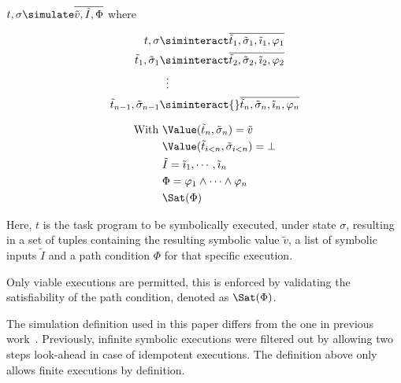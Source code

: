 \begin{definition}[Simulation]
  $t,\sigma\simulate \overline{\tilde{v},\tilde{I},\Phi}$ where

  \begin{minipage}[c]{0.4\textwidth}
    \begin{align*}
      t,\sigma             & \siminteract  \overline{\tilde{t}_1,\tilde{\sigma}_1,\tilde{\imath}_1,\phi_1}\\
      \tilde{t}_1,\tilde{\sigma}_1         & \siminteract  \overline{\tilde{t}_2,\tilde{\sigma}_2,\tilde{\imath}_2,\phi_2}\\
                           & \hspace{2mm}\vdots    \\
      \tilde{t}_{n-1},\tilde{\sigma}_{n-1} & \siminteract{}  \overline{\tilde{t}_n,\tilde{\sigma}_n,\tilde{\imath}_n,\phi_n}
    \end{align*}
\end{minipage}
\begin{minipage}[c]{0.1\textwidth}
  \Quad
\end{minipage}
\begin{minipage}[c]{0.3\textwidth}
  \begin{align*}
    \text{With }& \Value(\tilde{t}_n,\tilde{\sigma}_n)=\tilde{v}\\
    &\Value(\tilde{t}_{i<n},\tilde{\sigma}_{i<n})=\bot\\
    &\tilde{I}=\tilde{\imath}_1,\cdots,\tilde{\imath}_n\\
    &\Phi = \phi_1\land\cdots\land\phi_n\\
    &\Sat(\Phi)
  \end{align*}
\end{minipage}
\end{definition}

Here, $t$ is the task program to be symbolically executed, under state $\sigma$,
resulting in a set of tuples containing the resulting symbolic value $\tilde{v}$, a list of symbolic inputs $\tilde{I}$ and a path condition $\Phi$ for that specific execution.

Only viable executions are permitted, this is enforced by validating the satisfiability of the path condition, denoted as $\Sat(\Phi)$.

The simulation definition used in this paper differs from the one in previous work~\cite{Naus2019}.
Previously, infinite symbolic executions were filtered out by allowing two steps look-ahead in case of idempotent executions.
The definition above only allows finite executions by definition.

